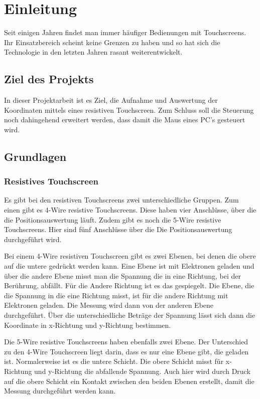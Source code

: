 \chapter{Einleitung}
Seit einigen Jahren findet man immer häufiger Bedienungen mit Touchscreens. Ihr Einsatzbereich scheint keine Grenzen zu haben und so hat sich die Technologie in den letzten Jahren rasant weiterentwickelt.


\section{Ziel des Projekts}
In dieser Projektarbeit ist es Ziel, die Aufnahme und Auswertung der Koordinaten mittels eines resistiven Touchscreen. Zum Schluss soll die Steuerung noch dahingehend erweitert werden, dass damit die Maus eines PC's gesteuert wird.


\section{Grundlagen}
\subsection{Resistives Touchscreen}
Es gibt bei den resistiven Touchscreens zwei unterschiedliche Gruppen. Zum einen gibt es 4-Wire resistive Touchscreens. Diese haben vier Anschlüsse, über die die Positionsauswertung läuft. 
Zudem gibt es noch die 5-Wire resistive Touchscreens. Hier sind fünf Anschlüsse über die Die Positionsauswertung durchgeführt wird. 

Bei einem 4-Wire resistiven Touchscreen gibt es zwei Ebenen, bei denen die obere auf die untere gedrückt werden kann. Eine Ebene ist mit Elektronen geladen und über die andere Ebene misst man die Spannung 
die in eine Richtung, bei der Berührung, abfällt. Für die Andere Richtung ist es das gespiegelt. Die Ebene, die  die Spannung in die eine Richtung misst, ist für die andere Richtung mit Elektronen geladen. Die Messung wird dann von der anderen Ebene durchgeführt.
Über die unterschiedliche Beträge der Spannung lässt sich dann die Koordinate in x-Richtung und y-Richtung bestimmen. 

Die 5-Wire resistive Touchscreens haben ebenfalls zwei Ebene. Der Unterschied zu den 4-Wire Touchscreen liegt darin, dass es nur eine Ebene gibt, die geladen ist. Normalerweise ist es die untere Schicht. Die obere Schicht misst  für x-Richtung und y-Richtung die abfallende Spannung.
Auch hier wird durch Druck auf die obere Schicht ein Kontakt zwischen den beiden Ebenen erstellt, damit die Messung durchgeführt werden kann. 

